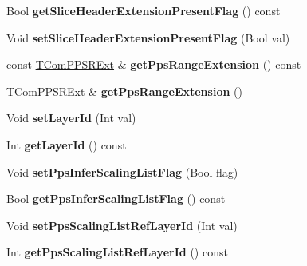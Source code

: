 \begin{DoxyCompactItemize}
\item 
\mbox{\label{class_t_com_p_p_s_aca14d439d3b0b297e660974b328a49f9}} 
Bool {\bfseries get\+Slice\+Header\+Extension\+Present\+Flag} () const
\item 
\mbox{\label{class_t_com_p_p_s_ab1029258892c03420a75b5f45333e17f}} 
Void {\bfseries set\+Slice\+Header\+Extension\+Present\+Flag} (Bool val)
\item 
\mbox{\label{class_t_com_p_p_s_aa2d3d8518cf64bf042a22a67f1209b09}} 
const \hyperlink{class_t_com_p_p_s_r_ext}{T\+Com\+P\+P\+S\+R\+Ext} \& {\bfseries get\+Pps\+Range\+Extension} () const
\item 
\mbox{\label{class_t_com_p_p_s_a538e7261a426993c7185409410ffd4a6}} 
\hyperlink{class_t_com_p_p_s_r_ext}{T\+Com\+P\+P\+S\+R\+Ext} \& {\bfseries get\+Pps\+Range\+Extension} ()
\item 
\mbox{\label{class_t_com_p_p_s_ad4dd0c04092a19e54c240259e9bac2ae}} 
Void {\bfseries set\+Layer\+Id} (Int val)
\item 
\mbox{\label{class_t_com_p_p_s_acae5cf4f18df9e9babce07c534acf4d9}} 
Int {\bfseries get\+Layer\+Id} () const
\item 
\mbox{\label{class_t_com_p_p_s_a952a5c70332bd2e6fff725f44c8b6041}} 
Void {\bfseries set\+Pps\+Infer\+Scaling\+List\+Flag} (Bool flag)
\item 
\mbox{\label{class_t_com_p_p_s_a75d9ad239a3da5152557f0da23b38854}} 
Bool {\bfseries get\+Pps\+Infer\+Scaling\+List\+Flag} () const
\item 
\mbox{\label{class_t_com_p_p_s_ada61d9ebf996f5b932426c1d6c05a3da}} 
Void {\bfseries set\+Pps\+Scaling\+List\+Ref\+Layer\+Id} (Int val)
\item 
\mbox{\label{class_t_com_p_p_s_a88c5e624c007fa5ffbace1aa590c9eb1}} 
Int {\bfseries get\+Pps\+Scaling\+List\+Ref\+Layer\+Id} () const
\item 
\mbox{\label{class_t_com_p_p_s_a8f6eb71847645af210f69c869e744a94}} 

\end{DoxyCompactItemize}
